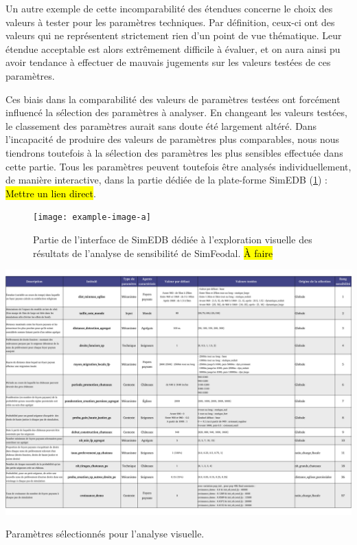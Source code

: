 Un autre exemple de cette incomparabilité des étendues concerne le choix des valeurs à tester pour les paramètres techniques.
Par définition, ceux-ci ont des valeurs qui ne représentent strictement rien d'un point de vue thématique.
Leur étendue acceptable est alors extrêmement difficile à évaluer, et on aura ainsi pu avoir tendance à effectuer de mauvais jugements sur les valeurs testées de ces paramètres.

Ces biais dans la comparabilité des valeurs de paramètres testées ont forcément influencé la sélection des paramètres à analyser.
En changeant les valeurs testées, le classement des paramètres aurait sans doute été largement altéré.
Dans l'incapacité de produire des valeurs de paramètres plus comparables, nous nous tiendrons toutefois à la sélection des paramètres \og les plus sensibles\fg{} effectuée dans cette partie.
Tous les paramètres peuvent toutefois être analysés individuellement, de manière interactive, dans la partie dédiée de la plate-forme SimEDB (\cref{fig:screenshot-simedb-sensib}) : \hl{Mettre un lien direct}.

\begin{figure}[H]
	\centering
	\texttt{[image: example-image-a]}
	\caption[Partie de l'interface de SimEDB dédiée à l'exploration visuelle des résultats de l'analyse de sensibilité de SimFeodal.]{Partie de l'interface de SimEDB dédiée à l'exploration visuelle des résultats de l'analyse de sensibilité de SimFeodal. \hl{À faire}}
	\label{fig:screenshot-simedb-sensib}
\end{figure}

\clearpage
\begin{table}[H]\vspace*{-1em}
\centering
\includegraphics[width=\textheight, angle=90, origin=c]{img/Parametres.pdf}
\caption{Paramètres sélectionnés pour l'analyse visuelle.}
\label{tab:selection-parametres-anavis}
\end{table}

